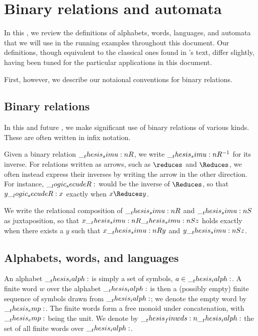 \chapter{Binary relations and automata}\label{ch:automata}\label{ch:finite-automata}

In this , we review the definitions of alphabets, words, languages, and automata that we will use in the running examples throughout this document.
Our definitions, though equivalent to the classical ones found in \citeauthor{Hopcroft+:06}'s text\autocite{Hopcroft+:06}, differ slightly, having been tuned for the particular applications in this document.

First, however, we describe our notaional conventions for binary relations.

\section{Binary relations}

In this and future , we make significant use of binary relations of various kinds.
These are often written in infix notation.

Given a binary relation $\__thesis_simu:n {R}$, we write $\__thesis_simu:n {R}^{-1}$ for its inverse.
For relations written as arrows, such as $\reduces$ and $\Reduces$, we often instead express their inverses by writing the arrow in the other direction.
For instance, $\__logic_secudeR:$ would be the inverse of $\Reduces$, so that $y \__logic_secudeR: x$ exactly when $x \Reduces y$.

We write the relational composition of $\__thesis_simu:n {R}$ and $\__thesis_simu:n {S}$ as juxtaposition, so that $x \__thesis_simu:n {R}\__thesis_simu:n {S} z$ holds exactly when there exists a $y$ such that $x \__thesis_simu:n {R} y$ and $y \__thesis_simu:n {S} z$.

\section{Alphabets, words, and languages}

An alphabet $\__thesis_ialph:$ is simply a set of symbols, $a \in \__thesis_ialph:$.
A finite word $w$ over the alphabet $\__thesis_ialph:$ is then a (possibly empty) finite sequence of symbols drawn from $\__thesis_ialph:$;
we denote the empty word by $\__thesis_emp:$.
The finite words form a free monoid under concatenation, with $\__thesis_emp:$ being the unit.
We denote by $\__thesis_finwds:n {\__thesis_ialph:}$ the set of all finite words over $\__thesis_ialph:$.

